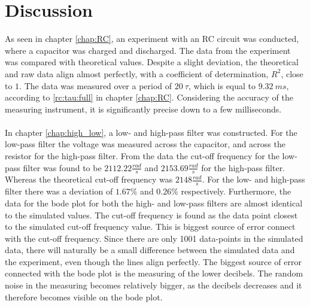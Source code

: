 \chapter{Discussion}
As seen in chapter \ref{chap:RC}, an experiment with an RC circuit was conducted, where a capacitor was charged and discharged. The data from the experiment was compared with theoretical values. Despite a slight deviation, the theoretical and raw data align almost perfectly, with a coefficient of determination, $R^2$, close to $1$. The data was measured over a period of $20\ \tau$, which is equal to $9.32\ ms$, according to \eqref{rc:tau:full} in chapter \ref{chap:RC}. Considering the accuracy of the measuring instrument, it is significantly precise down to a few milliseconds. 
\\ \\
In chapter \ref{chap:high_low}, a low- and high-pass filter was constructed. For the low-pass filter the voltage was measured across the capacitor, and across the resistor for the high-pass filter. From the data the cut-off frequency for the low-pass filter was found to be $2112.22 \frac{rad}{s}$ and $2153.69 \frac{rad}{s}$ for the high-pass filter. Whereas the theoretical cut-off frequency was $2148 \frac{rad}{s}$. For the low- and high-pass filter there was a deviation of $1.67 \% $ and $0.26 \% $ respectively. Furthermore, the data for the bode plot for both the high- and low-pass filters are almost identical to the simulated values. The cut-off frequency is found as the data point closest to the simulated cut-off frequency value. This is biggest source of error connect with the cut-off frequency. Since there are only 1001 data-points in the simulated data, there will naturally be a small difference between the simulated data and the experiment, even though the lines align perfectly. The biggest source of error connected with the bode plot is the measuring of the lower decibels. The random noise in the measuring becomes relatively bigger, as the decibels decreases and it therefore becomes visible on the bode plot.